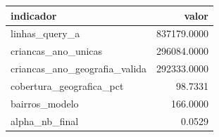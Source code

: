 \begin{tabular}{lr}
\toprule
indicador & valor \\
\midrule
linhas_query_a & 837179.0000 \\
criancas_ano_unicas & 296084.0000 \\
criancas_ano_geografia_valida & 292333.0000 \\
cobertura_geografica_pct & 98.7331 \\
bairros_modelo & 166.0000 \\
alpha_nb_final & 0.0529 \\
\bottomrule
\end{tabular}
